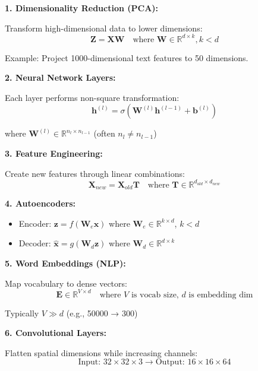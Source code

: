 \documentclass[12pt,a4paper]{article}
\theoremstyle{definition}
\begin{document}
\begin{tcolorbox}[enhanced,breakable,colback=green!5!white,colframe=green!75!black,title=ML/DL Applications of Non-square Transformations]

\textbf{1. Dimensionality Reduction (PCA):}

Transform high-dimensional data to lower dimensions:
\begin{equation}
\mathbf{Z} = \mathbf{X}\mathbf{W} \quad \text{where } \mathbf{W} \in \mathbb{R}^{d \times k}, k < d
\end{equation}

Example: Project 1000-dimensional text features to 50 dimensions.

\textbf{2. Neural Network Layers:}

Each layer performs non-square transformation:
\begin{equation}
\mathbf{h}^{(l)} = \sigma(\mathbf{W}^{(l)}\mathbf{h}^{(l-1)} + \mathbf{b}^{(l)})
\end{equation}

where $\mathbf{W}^{(l)} \in \mathbb{R}^{n_l \times n_{l-1}}$ (often $n_l \neq n_{l-1}$)

\textbf{3. Feature Engineering:}

Create new features through linear combinations:
\begin{equation}
\mathbf{X}_{new} = \mathbf{X}_{old}\mathbf{T} \quad \text{where } \mathbf{T} \in \mathbb{R}^{d_{old} \times d_{new}}
\end{equation}

\textbf{4. Autoencoders:}

\begin{itemize}
    \item Encoder: $\mathbf{z} = f(\mathbf{W}_e\mathbf{x})$ where $\mathbf{W}_e \in \mathbb{R}^{k \times d}$, $k < d$
    \item Decoder: $\hat{\mathbf{x}} = g(\mathbf{W}_d\mathbf{z})$ where $\mathbf{W}_d \in \mathbb{R}^{d \times k}$
\end{itemize}

\textbf{5. Word Embeddings (NLP):}

Map vocabulary to dense vectors:
\begin{equation}
\mathbf{E} \in \mathbb{R}^{V \times d} \quad \text{where } V \text{ is vocab size, } d \text{ is embedding dim}
\end{equation}

Typically $V \gg d$ (e.g., 50000 → 300)

\textbf{6. Convolutional Layers:}

Flatten spatial dimensions while increasing channels:
\begin{equation}
\text{Input: } 32 \times 32 \times 3 \to \text{Output: } 16 \times 16 \times 64
\end{equation}
\end{tcolorbox}
\end{document}
